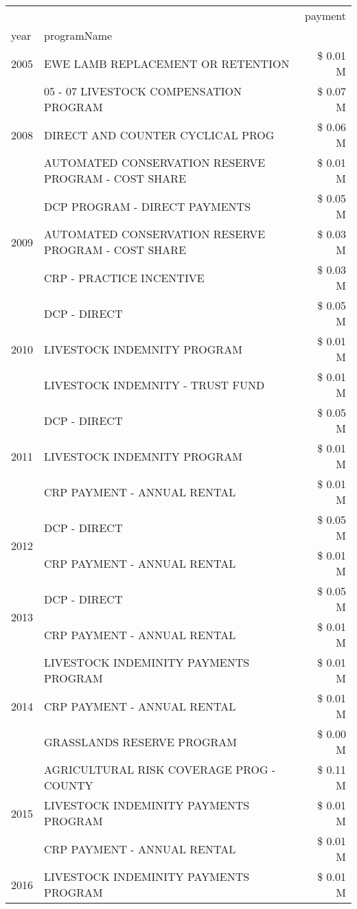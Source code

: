 \begin{tabular}{llr}
\toprule
 &  & payment \\
year & programName &  \\
\midrule
2005 & EWE LAMB REPLACEMENT OR RETENTION & \$ 0.01 M \\
\cline{1-3}
\multirow[t]{3}{*}{2008} & 05 - 07 LIVESTOCK COMPENSATION PROGRAM & \$ 0.07 M \\
 & DIRECT AND COUNTER CYCLICAL PROG & \$ 0.06 M \\
 & AUTOMATED CONSERVATION RESERVE PROGRAM - COST SHARE & \$ 0.01 M \\
\cline{1-3}
\multirow[t]{3}{*}{2009} & DCP PROGRAM - DIRECT PAYMENTS & \$ 0.05 M \\
 & AUTOMATED CONSERVATION RESERVE PROGRAM - COST SHARE & \$ 0.03 M \\
 & CRP - PRACTICE INCENTIVE & \$ 0.03 M \\
\cline{1-3}
\multirow[t]{3}{*}{2010} & DCP - DIRECT & \$ 0.05 M \\
 & LIVESTOCK INDEMNITY PROGRAM & \$ 0.01 M \\
 & LIVESTOCK INDEMNITY - TRUST FUND & \$ 0.01 M \\
\cline{1-3}
\multirow[t]{3}{*}{2011} & DCP - DIRECT & \$ 0.05 M \\
 & LIVESTOCK INDEMNITY PROGRAM & \$ 0.01 M \\
 & CRP PAYMENT - ANNUAL RENTAL & \$ 0.01 M \\
\cline{1-3}
\multirow[t]{2}{*}{2012} & DCP - DIRECT & \$ 0.05 M \\
 & CRP PAYMENT - ANNUAL RENTAL & \$ 0.01 M \\
\cline{1-3}
\multirow[t]{2}{*}{2013} & DCP - DIRECT & \$ 0.05 M \\
 & CRP PAYMENT - ANNUAL RENTAL & \$ 0.01 M \\
\cline{1-3}
\multirow[t]{3}{*}{2014} & LIVESTOCK INDEMINITY PAYMENTS PROGRAM & \$ 0.01 M \\
 & CRP PAYMENT - ANNUAL RENTAL & \$ 0.01 M \\
 & GRASSLANDS RESERVE PROGRAM & \$ 0.00 M \\
\cline{1-3}
\multirow[t]{3}{*}{2015} & AGRICULTURAL RISK COVERAGE PROG - COUNTY & \$ 0.11 M \\
 & LIVESTOCK INDEMINITY PAYMENTS PROGRAM & \$ 0.01 M \\
 & CRP PAYMENT - ANNUAL RENTAL & \$ 0.01 M \\
\cline{1-3}
\multirow[t]{3}{*}{2016} & LIVESTOCK INDEMINITY PAYMENTS PROGRAM & \$ 0.01 M \\

\end{tabular}
